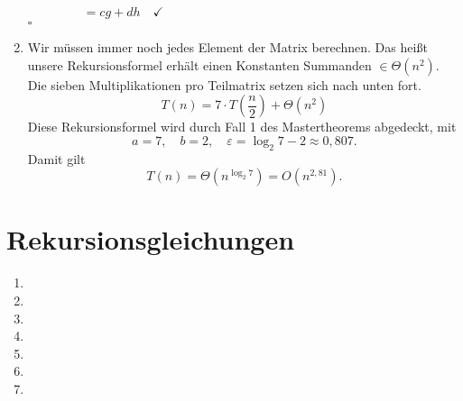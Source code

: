 \documentclass[a4paper,10pt]{scrartcl}
\begin{document}
\begin{enumerate}
        \begin{align*}
                    &= cg + dh \quad \checkmark \qquad \qquad \qquad \qquad \qquad \qquad \qquad \qquad \qquad \qquad
        \end{align*}\hfill $\square$
\item   Wir müssen immer noch jedes Element der Matrix berechnen. Das heißt unsere Rekursionsformel erhält einen Konstanten Summanden $\in \Theta(n^2)$. Die sieben Multiplikationen pro Teilmatrix setzen sich nach unten fort.
        \[
         T(n) = 7 \cdot T\left(\frac{n}{2}\right) + \Theta(n^2)
        \]
        Diese Rekursionsformel wird durch Fall 1 des Mastertheorems abgedeckt, mit 
        \[a = 7,\quad b = 2,\quad \varepsilon = \log_2 7 - 2 \approx 0{,}807.\]
        Damit gilt
        \[T(n) = \Theta\left(n^{\log_2 7}\right) = O\left(n^{2{,}81}\right).\]
\end{enumerate}


\section{Rekursionsgleichungen}
\begin{enumerate}
\item   
\item   
\item   
\item   
\item   
\item   
\item   
\end{enumerate}
\end{document}
